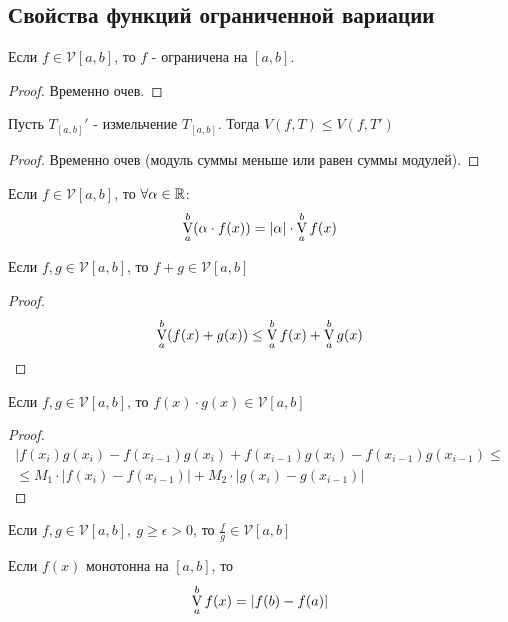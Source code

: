 \subsection{Свойства функций ограниченной вариации}
\begin{numtheorem}
    Если $f\in \mathcal{V}[a,b]$, то $f$ - ограничена на $[a,b]$.
\end{numtheorem}
\begin{proof}
    Временно очев.
\end{proof}
\begin{numtheorem}
    Пусть $T_{[a,b]}'$ - измельчение $T_{[a,b]}$. Тогда $V(f, T)\leq V(f, T')$
\end{numtheorem} 
\begin{proof}
    Временно очев (модуль суммы меньше или равен суммы модулей).
\end{proof} 
\begin{numtheorem}
    Если $f\in \mathcal{V} [a,b]$, то $\forall \alpha\in \mathbb{R}$:
    \[\operatorname*{V}\limits_{a}^{b}(\alpha\cdot f(x))=|\alpha|\cdot \operatorname*{V}\limits_{a}^{b} f(x)\] 
\end{numtheorem} 
\begin{numtheorem}
    Если $f,g\in \mathcal{V}[a,b]$, то $f+g\in \mathcal{V}[a,b]$
\end{numtheorem} 
\begin{proof}
    \[\operatorname*{V}\limits_{a}^{b} (f(x)+g(x))\leq \operatorname*{V}\limits_{a}^{b} f(x)+\operatorname*{V}\limits_{a}^{b} g(x)\]
\end{proof} 
\begin{numtheorem}
    Если $f,g\in \mathcal{V}[a,b]$, то $f(x)\cdot g(x)\in \mathcal{V}[a,b]$
\end{numtheorem} 
\begin{proof}
    \begin{multline*}
        |f(x_i)g(x_i)-f(x_{i-1})g(x_i)+f(x_{i-1})g(x_{i})-f(x_{i-1})g(x_{i-1})\leq\\
        \leq M_1\cdot |f(x_i)-f(x_{i-1})|+M_2\cdot |g(x_i)-g(x_{i-1})|
    \end{multline*}
\end{proof} 
\begin{numtheorem}
    Если $f,g\in \mathcal{V}[a,b],\ g\geq \epsilon>0$, то $\frac{f}{g}\in \mathcal{V}[a,b]$
\end{numtheorem} 
\begin{numtheorem}
    Если $f(x)$ монотонна на $[a,b]$, то
    \[\operatorname*{V}\limits_{a}^{b} f(x)=|f(b)- f(a)|\]
\end{numtheorem}

